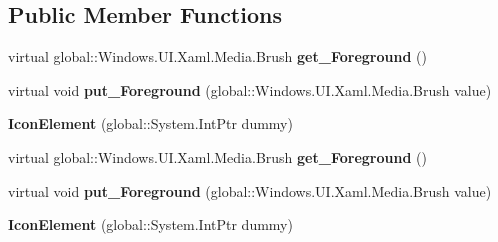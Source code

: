 \subsection*{Public Member Functions}
\begin{DoxyCompactItemize}
\item 
\mbox{\label{class_windows_1_1_u_i_1_1_xaml_1_1_controls_1_1_icon_element_a79a4b40ddfa24c650ae2b595b323cbef}} 
virtual global\+::\+Windows.\+U\+I.\+Xaml.\+Media.\+Brush {\bfseries get\+\_\+\+Foreground} ()
\item 
\mbox{\label{class_windows_1_1_u_i_1_1_xaml_1_1_controls_1_1_icon_element_aa8b56f893f1ba3644646a54ddb2950e3}} 
virtual void {\bfseries put\+\_\+\+Foreground} (global\+::\+Windows.\+U\+I.\+Xaml.\+Media.\+Brush value)
\item 
\mbox{\label{class_windows_1_1_u_i_1_1_xaml_1_1_controls_1_1_icon_element_a2b5648363248a4b6c8fbaac0951df7ad}} 
{\bfseries Icon\+Element} (global\+::\+System.\+Int\+Ptr dummy)
\item 
\mbox{\label{class_windows_1_1_u_i_1_1_xaml_1_1_controls_1_1_icon_element_a79a4b40ddfa24c650ae2b595b323cbef}} 
virtual global\+::\+Windows.\+U\+I.\+Xaml.\+Media.\+Brush {\bfseries get\+\_\+\+Foreground} ()
\item 
\mbox{\label{class_windows_1_1_u_i_1_1_xaml_1_1_controls_1_1_icon_element_aa8b56f893f1ba3644646a54ddb2950e3}} 
virtual void {\bfseries put\+\_\+\+Foreground} (global\+::\+Windows.\+U\+I.\+Xaml.\+Media.\+Brush value)
\item 
\mbox{\label{class_windows_1_1_u_i_1_1_xaml_1_1_controls_1_1_icon_element_a2b5648363248a4b6c8fbaac0951df7ad}} 
{\bfseries Icon\+Element} (global\+::\+System.\+Int\+Ptr dummy)
\item 
\mbox{\label{class_windows_1_1_u_i_1_1_xaml_1_1_controls_1_1_icon_element_a79a4b40ddfa24c650ae2b595b323cbef}} 

\end{DoxyCompactItemize}
